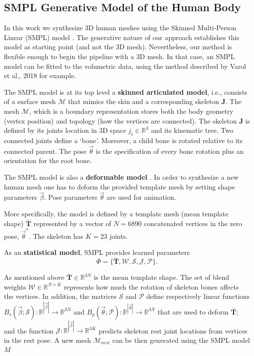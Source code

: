 \documentclass[runningheads, orivec]{llncs}
\begin{document}
\subsection{SMPL Generative Model of the Human Body}\label{subsec:smpl_model}
In this work we synthesize 3D human meshes using the Skinned Multi-Person 
Linear (SMPL) model \cite{Loper.2015}. The generative nature of our approach 
establishes this 
model as starting point (and not the 3D mesh). Nevertheless, our method is 
flexible enough to begin the pipeline with a 3D mesh. In that case, an SMPL 
model can be fitted to the volumetric data, using the method described by 
Varol et al., 2018 \cite{varol18_bodynet} for example.

The SMPL model is at its top level a \textbf{skinned articulated 
model}, i.e., 
consists of a 
surface mesh $\mathcal{M}$ that mimics the skin and a corresponding skeleton 
$\mathbf{J}$. The mesh $\mathcal{M}$, which is a boundary 
representation stores 
both the body geometry (vertex position) and topology (how the vertices are 
connected). The skeleton $\mathbf{J}$ is defined by its joints location in 3D 
space $j_i \in \mathbb{R}^3$  and its kinematic tree. Two 
connected 
joints define a `bone'. Moreover, a child bone is rotated relative to 
its 
connected parent. The pose $\vec{\theta}$ is the specification of every bone 
rotation plus an orientation for the root bone.

The SMPL model is also a \textbf{deformable model} 
\cite{Terzopoulos.1987}. In order to 
synthesize a 
new human mesh one has to deform the provided template mesh by 
setting shape parameters $\vec{\beta}$. Pose parameters $\vec{\theta}$ are used 
for animation.

More specifically, the model is defined by a template mesh (mean template 
shape) $\mathbf{\bar{T}}$ represented by a vector of $N = 6890$ concatenated 
vertices in the zero pose, $\vec{\theta}^*$. The skeleton has $K = 23$ joints.

As an \textbf{statistical model}, SMPL provides learned parameters
\begin{equation} \label{eq:smpl_params}
\Phi = \{\mathbf{\bar{T}}, \mathcal{W}, \mathcal{S}, \mathcal{J}, 
\mathcal{P}\}.
\end{equation}

As mentioned above $\mathbf{\bar{T}} \in \mathbb{R}^{3N}$  is the mean template 
shape. The set of blend weights $\mathcal{W} \in \mathbb{R}^{N \times K}$ 
represents 
how much the rotation of 
skeleton bones affects
the vertices. In addition, the matrices $\mathcal{S}$ and $\mathcal{P}$ define 
respectively linear functions $B_s(\vec{\beta}; \mathcal{S}): 
\mathbb{R}^{|\vec{\beta}|} \to 
\mathbb{R}^{3N}$ and $B_p(\vec{\theta}; \mathcal{P}): 
\mathbb{R}^{|\vec{\theta}|} \to 
\mathbb{R}^{3N}$ that are used to deform $\mathbf{\bar{T}}$; and the function 
$\mathcal{J}: \mathbb{R}^{|\vec{\beta}|} \to \mathbb{R}^{3K}$ predicts skeleton 
rest joint locations from vertices in the rest 
pose. A new mesh $\mathcal{M}_{new}$ can be then generated using the SMPL model 
$M$
\end{document}
